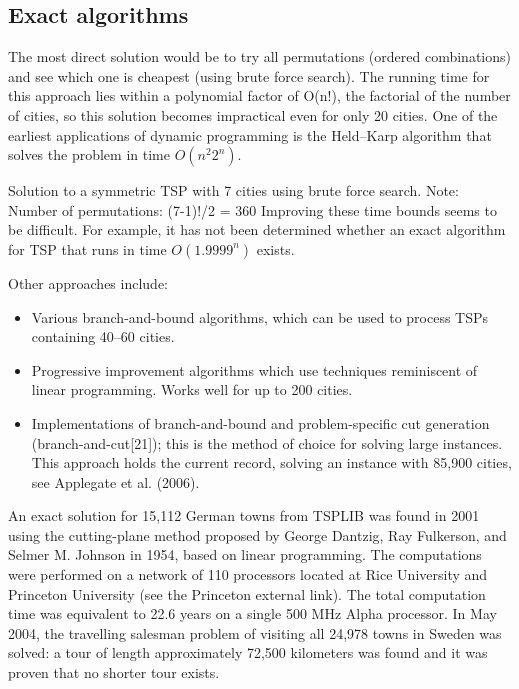 
\subsection{Exact algorithms}

The most direct solution would be to try all permutations (ordered combinations) and see which one is cheapest (using brute force search). The running time for this approach lies within a polynomial factor of O(n!), the factorial of the number of cities, so this solution becomes impractical even for only 20 cities. One of the earliest applications of dynamic programming is the Held–Karp algorithm that solves the problem in time $O(n^2 2^n)$.


Solution to a symmetric TSP with 7 cities using brute force search. Note: Number of permutations: (7-1)!/2 = 360
Improving these time bounds seems to be difficult. For example, it has not been determined whether an exact algorithm for TSP that runs in time $O(1.9999^n)$ exists.

Other approaches include:

\begin{itemize}

\item Various branch-and-bound algorithms, which can be used to process TSPs containing 40–60 cities.

\item Progressive improvement algorithms which use techniques reminiscent of linear programming. Works well for up to 200 cities.

\item 

Implementations of branch-and-bound and problem-specific cut generation (branch-and-cut[21]); this is the method of choice for solving large instances. This approach holds the current record, solving an instance with 85,900 cities, see Applegate et al. (2006).

\end{itemize}


An exact solution for 15,112 German towns from TSPLIB was found in 2001 using the cutting-plane method proposed by George Dantzig, Ray Fulkerson, and Selmer M. Johnson in 1954, based on linear programming. The computations were performed on a network of 110 processors located at Rice University and Princeton University (see the Princeton external link). The total computation time was equivalent to 22.6 years on a single 500 MHz Alpha processor. In May 2004, the travelling salesman problem of visiting all 24,978 towns in Sweden was solved: a tour of length approximately 72,500 kilometers was found and it was proven that no shorter tour exists.

